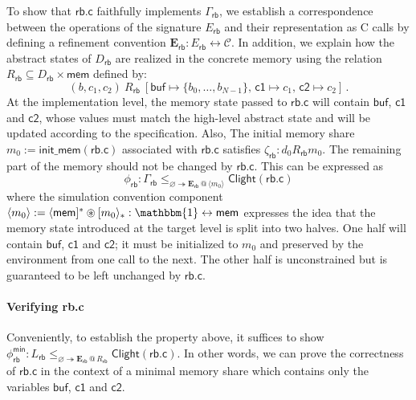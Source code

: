 \documentclass[acmsmall,screen,review,nonacm]{acmart}
\newcommand{\kw}[1]{\ensuremath{ \mathsf{#1} }}
\newcommand{\sepconj}{\oast}
\begin{document}
\begin{example} %
To show that $\kw{rb.c}$
faithfully implements $\Gamma_\kw{rb}$,
we establish a correspondence
between the operations of the signature $E_\kw{rb}$
and their representation as C calls
by defining a refinement convention
$\mathbf{E}_\kw{rb} : E_\kw{rb} \leftrightarrow \mathcal{C}$.
In addition,
we explain how the abstract states of $D_\kw{rb}$
are realized in the concrete memory
using the relation
$R_\kw{rb} \subseteq D_\kw{rb} \times \kw{mem}$
defined by:
\[
  (b, c_1, c_2) \: \mathrel{R_\kw{rb}} \:
  [\kw{buf} \mapsto \{b_0, \ldots, b_{N-1}\}, \,
   \kw{c1} \mapsto c_1, \,
   \kw{c2} \mapsto c_2]
  \,.
\]
At the implementation level,
the memory state passed to $\kw{rb.c}$
will contain $\kw{buf}$, $\kw{c1}$ and $\kw{c2}$,
whose values must match the high-level abstract state
and will be updated according to the specification.
Also,
The initial memory share $m_0 := \kw{init\_mem}(\kw{rb.c})$
associated with $\kw{rb.c}$ satisfies
$\zeta_\kw{rb} : d_0 \mathrel{R_\kw{rb}} m_0$.
The remaining part of the memory should not be changed by $\kw{rb.c}$.
This can be expressed as
\begin{equation} \label{eqn:rbcorrect}
  \phi_\kw{rb} :
  \Gamma_\kw{rb}
  \le_{\varnothing \twoheadrightarrow
       \mathbf{E}_\kw{rb} \mathbin@ \langle m_0 \rangle }
  \kw{Clight}(\kw{rb.c})
\end{equation}
where the simulation convention component
$\langle m_0 \rangle :=
 \langle \kw{mem} ]^* \sepconj [m_0\rangle_* :
 \mathbbm{1} \leftrightarrow \kw{mem}$
expresses the idea that
the memory state introduced at the target level is split into two halves.
One half will contain $\kw{buf}$, $\kw{c1}$ and $\kw{c2}$;
it must be initialized to $m_0$
and preserved by the environment from one call to the next.
The other half is unconstrained
but is guaranteed to be left unchanged by $\kw{rb.c}$.
\end{example}

\paragraph{Verifying rb.c}Conveniently,
to establish the property above,
it suffices to show
$\phi_\kw{rb}^\kw{min} :
  L_\kw{rb}
  \le_{\varnothing \twoheadrightarrow \mathbf{E}_\kw{rb} \mathbin@ R_\kw{rb}}
  \kw{Clight}(\kw{rb.c})
$.
In other words,
we can prove the correctness of $\kw{rb.c}$
in the context of a minimal memory share
which contains only the variables $\kw{buf}$, $\kw{c1}$ and $\kw{c2}$.
\end{document}
